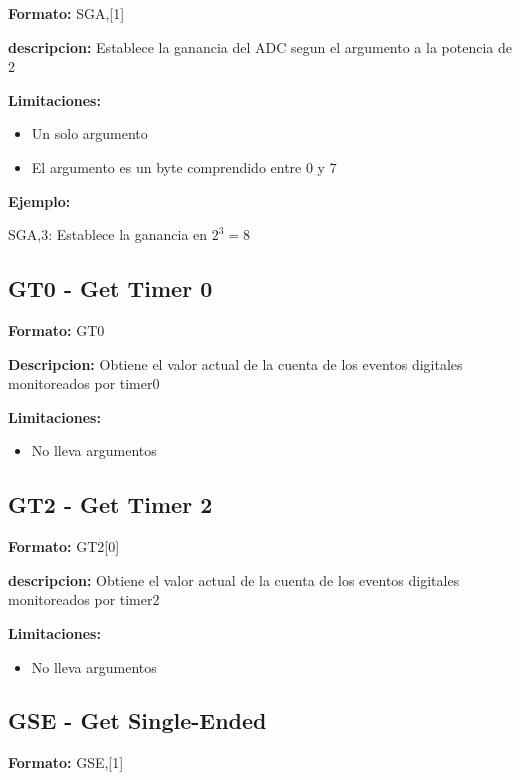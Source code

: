 \textbf{Formato:} SGA,[1]

\textbf{descripcion:}
Establece la ganancia del ADC segun el argumento a la potencia de 2

\textbf{Limitaciones:}
\begin{itemize}
  \item Un solo argumento
  \item El argumento es un byte comprendido entre 0 y 7
\end{itemize}

\textbf{Ejemplo:}

SGA,3: Establece la ganancia en $2^{3} = 8$


\subsection{GT0 - Get Timer 0} %
\label{sub:gt0_get_timer_0}


\textbf{Formato:} GT0

\textbf{Descripcion:}
Obtiene el valor actual de la cuenta de los eventos digitales monitoreados por timer0

\textbf{Limitaciones:}
\begin{itemize}
  \item No lleva argumentos
\end{itemize}


\subsection{GT2 - Get Timer 2} %
\label{sub:gt2_get_timer_2}

\textbf{Formato:} GT2[0]

\textbf{descripcion:}
Obtiene el valor actual de la cuenta de los eventos digitales monitoreados por timer2

\textbf{Limitaciones:}
\begin{itemize}
  \item No lleva argumentos
\end{itemize}


\subsection{GSE - Get Single-Ended} %
\label{sub:gse_get_single_ended}
\textbf{Formato:} GSE,[1]

